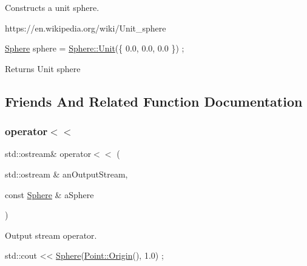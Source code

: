 Constructs a unit sphere. 

https\+://en.wikipedia.\+org/wiki/\+Unit\+\_\+sphere


\begin{DoxyCode}
\hyperlink{classlibrary_1_1math_1_1geom_1_1d3_1_1objects_1_1_sphere_a55dccc8ea16ee55cd7694c26afa8ea39}{Sphere} sphere = \hyperlink{classlibrary_1_1math_1_1geom_1_1d3_1_1objects_1_1_sphere_a5464ea9145425db63dedbd896d6c97b0}{Sphere::Unit}(\{ 0.0, 0.0, 0.0 \}) ;
\end{DoxyCode}


\begin{DoxyReturn}{Returns}
Unit sphere 
\end{DoxyReturn}


\subsection{Friends And Related Function Documentation}
\mbox{\label{classlibrary_1_1math_1_1geom_1_1d3_1_1objects_1_1_sphere_abb141c02e081d1acce5f0d840276a5dd}} 
\subsubsection{\texorpdfstring{operator$<$$<$}{operator<<}}
{\footnotesize\ttfamily std\+::ostream\& operator$<$$<$ (\begin{DoxyParamCaption}\item[{std\+::ostream \&}]{an\+Output\+Stream,  }\item[{const \hyperlink{classlibrary_1_1math_1_1geom_1_1d3_1_1objects_1_1_sphere}{Sphere} \&}]{a\+Sphere }\end{DoxyParamCaption})\hspace{0.3cm}{\ttfamily [friend]}}



Output stream operator. 


\begin{DoxyCode}
std::cout << \hyperlink{classlibrary_1_1math_1_1geom_1_1d3_1_1objects_1_1_sphere_a55dccc8ea16ee55cd7694c26afa8ea39}{Sphere}(\hyperlink{classlibrary_1_1math_1_1geom_1_1d3_1_1objects_1_1_point_ab2a38e285c562e50bf350272c083986f}{Point::Origin}(), 1.0) ;
\end{DoxyCode}



